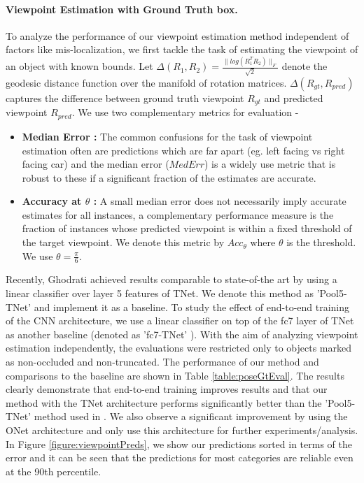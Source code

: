 \paragraph{Viewpoint Estimation with Ground Truth box.}
To analyze the performance of our viewpoint estimation method independent of factors like mis-localization, we first tackle the task of estimating the viewpoint of an object with known bounds. Let $\Delta(R_1,R_2) = \frac{ \| log(R_1^TR_2)\|_F}{\sqrt{2}}$ denote the geodesic distance function over the manifold of rotation matrices. $\Delta(R_{gt},R_{pred})$ captures the difference between ground truth viewpoint $R_{gt}$ and predicted viewpoint $R_{pred}$. We use two complementary metrics for evaluation -
\begin{itemize}
\item \textbf{Median Error :} The common confusions for the task of viewpoint estimation often are predictions which are far apart (eg. left facing vs right facing car) and the median error ($MedErr$) is a widely use metric that is robust to these if a significant fraction of the estimates are accurate.
\item \textbf{Accuracy at $\theta$ :} A small median error does not necessarily imply accurate estimates for all instances, a complementary performance measure is the fraction of instances whose predicted viewpoint is within a fixed threshold of the target viewpoint. We denote this metric by $Acc_{\theta}$ where $\theta$ is the threshold. We use $\theta = \frac{\pi}{6}$.
\end{itemize}
Recently, Ghodrati \etal \cite{ghodrati14viewpoint} achieved results comparable to state-of-the art by using a linear classifier over layer 5 features of TNet. We denote this method as 'Pool5-TNet' and implement it as a baseline. To study the effect of end-to-end training of the CNN architecture, we use a linear classifier on top of the fc7 layer of TNet as another baseline (denoted as 'fc7-TNet' ). With the aim of  analyzing viewpoint estimation independently, the evaluations were restricted only to objects marked as non-occluded and non-truncated. The performance of our method and comparisons to the baseline are shown in Table \ref{table:poseGtEval}. The results clearly demonstrate that end-to-end training improves results and that our method with the TNet architecture performs significantly better than the 'Pool5-TNet' method used in \cite{ghodrati14viewpoint}. We also observe a significant improvement by using the ONet architecture and only use this architecture for further experiments/analysis. In Figure \ref{figure:viewpointPreds}, we show our predictions sorted in terms of the error and  it can be seen that the predictions for most categories are reliable even at the 90th percentile.


